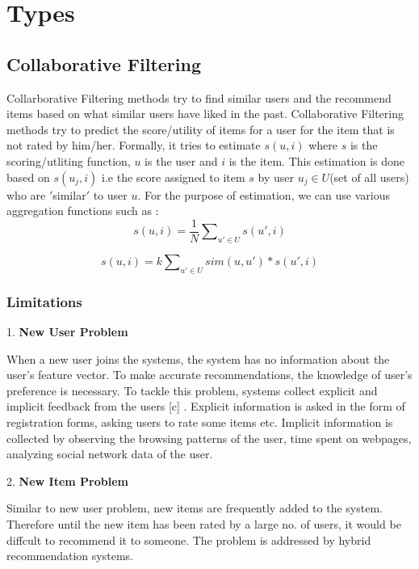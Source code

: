 \section{Types}
\subsection{Collaborative Filtering}
Collarborative Filtering methods try to find similar users and the recommend items based on what similar users have liked in the past. Collaborative Filtering methods try to predict the score/utility of items for a user for the item that is not rated by him/her. Formally, it tries to estimate $s(u,i)$ where $s$ is the scoring/utliting function, $u$ is the user and $i$ is the item. This estimation is done based on $s(u_j,i)$ i.e the score assigned to item $s$ by user $u_j\in U$(set of all users) who are $'$similar$'$ to user $u$. For the purpose of estimation, we can use various aggregation functions such as : 
\begin{equation}
s(u,i) = \frac{1}{N}\sum\nolimits_{u' \in U} s(u',i) 
\end{equation}

\begin{equation}
s(u,i) = k\sum\nolimits_{u' \in U} sim(u,u') * s(u',i) 
\end{equation}

\subsubsection{Limitations}

1. {\bf New User Problem}

When a new user joins the systems, the system has no information about the user's feature vector. To make accurate recommendations, the knowledge of user's preference is necessary. To tackle this problem, systems collect explicit and implicit feedback from the users [c] . Explicit information is asked in the form of registration forms, asking users to rate some items etc. Implicit information is collected by observing the browsing patterns of the user, time spent on webpages, analyzing social network data of the user.

2. {\bf New Item Problem}

Similar to new user problem, new items are frequently added to the system. Therefore until the new item has been rated by a large no. of users, it would be diffcult to recommend it to someone. The problem is addressed by hybrid recommendation systems.

